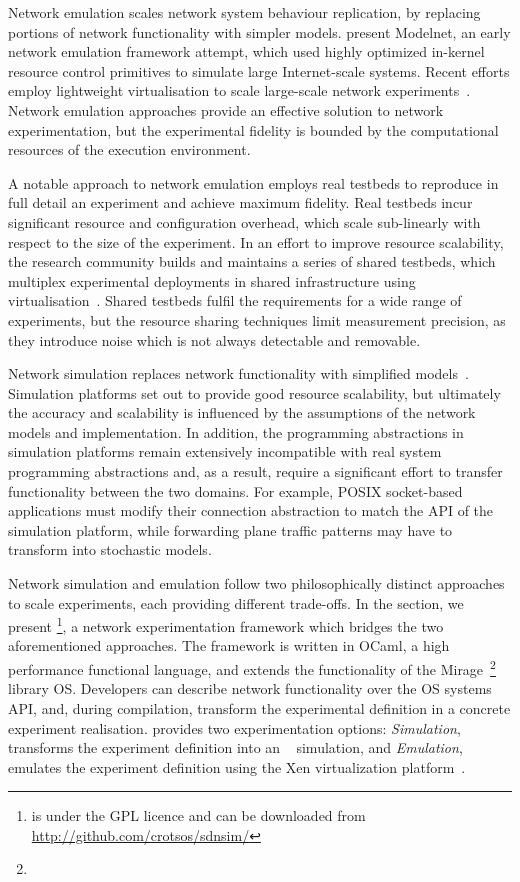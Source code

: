 Network emulation scales network system behaviour replication, by replacing
portions of network functionality with simpler models.  
present Modelnet, an early network emulation framework attempt, which used
highly optimized in-kernel resource control primitives to simulate large
Internet-scale systems. Recent efforts employ lightweight virtualisation to
scale large-scale network experiments~.
Network emulation approaches provide an effective solution to network
experimentation, but the experimental fidelity is bounded by the computational
resources of the execution environment.

A notable approach to network emulation employs real testbeds to reproduce in
full detail an experiment and achieve maximum fidelity. Real testbeds incur
significant resource and configuration overhead, which scale sub-linearly with
respect to the size of the experiment. In an effort to improve resource
scalability, the research community builds and maintains a series of shared
testbeds, which multiplex experimental deployments in shared infrastructure
using virtualisation~.  Shared testbeds fulfil the
requirements for a wide range of experiments, but the resource sharing
techniques limit measurement precision, as they introduce noise which is not
always detectable and removable. 

Network simulation replaces network functionality with simplified
models~.  Simulation platforms set out to
provide good resource scalability, but ultimately the accuracy and scalability
is influenced by the assumptions of the network models and implementation.  In
addition, the programming abstractions in simulation platforms remain
extensively incompatible with real system programming abstractions and, as a
result, require a significant effort to transfer functionality between the two
domains.  For example, POSIX socket-based applications must modify their
connection abstraction to match the API of the simulation platform, while
forwarding plane traffic patterns may have to transform into stochastic models. 

Network simulation and emulation follow two philosophically distinct approaches
to scale experiments, each providing different trade-offs.   In the section, we
present \sdnsim\footnote{\sdnsim is under the GPL licence and can be downloaded
  from \url{http://github.com/crotsos/sdnsim/}}, a network experimentation
framework which bridges the two aforementioned approaches. The framework is
written in OCaml, a high performance functional language, and extends the
functionality of the Mirage~\footnote{\mirageurl} library OS\@.  Developers can
describe network functionality over the \mirage OS systems API, and, during
compilation, transform the experimental definition in a concrete experiment
realisation. \sdnsim provides two experimentation options: \emph{Simulation},
transforms the experiment definition into an ~
simulation, and \emph{Emulation}, emulates the experiment definition using 
the Xen virtualization platform~.

